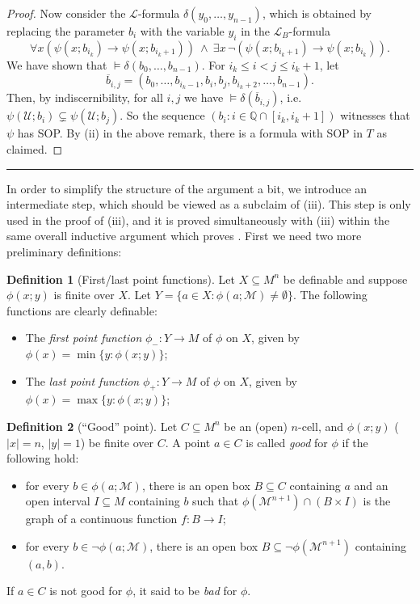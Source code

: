 \documentclass[a4paper]{report}
\newcommand{\ind}{\hspace{15pt}}
\newcommand{\Q}{\mathbb{Q}}
\renewcommand{\L}{\mathcal{L}}
\newcommand{\M}{\mathcal{M}}
\newcommand{\U}{\mathcal{U}}
\renewcommand{\b}{\overline{b}}
\newcommand{\simplies}{\rightarrow}
\theoremstyle{definition}
\newtheorem*{defn*}{Definition}
\theoremstyle{remstyle}
\begin{document}
\begin{proof}
	Now consider the $\L$-formula $\delta(y_0,\ldots,y_{n-1})$, which is obtained by replacing the parameter $b_i$ with the variable $y_i$ in the $\L_B$-formula
	\begin{equation*}
		\forall x(\psi(x;b_{i_k})\simplies\psi(x;b_{i_k+1}))\: \wedge\: \exists x\, \neg(\psi(x;b_{i_k+1})\simplies\psi(x;b_{i_k})).
	\end{equation*}
	We have shown that $\models \delta(b_0,\ldots,b_{n-1})$. For $i_k\leq i<j\leq i_k+1$, let
	\begin{equation*}
		\b_{i,j} = (b_0,\ldots,b_{i_k-1},b_i,b_j,b_{i_k+2},\ldots,b_{n-1}).
	\end{equation*}
	Then, by indiscernibility, for all $i,j$ we have $\models \delta(\b_{i,j})$, i.e.\ $\psi(\U;b_i) \subsetneq \psi(\U;b_j)$. So the sequence $(b_i:i\in\Q\cap[i_k,i_k+1])$ witnesses that $\psi$ has SOP. By (ii) in the above remark, there is a formula with SOP in $T$ as claimed.
\end{proof}


\par\noindent\rule{\textwidth}{0.4pt}

\celldeclem*

\ind In order to simplify the structure of the argument a bit, we introduce an intermediate step, which should be viewed as a subclaim of (iii). This step is only used in the proof of (iii), and it is proved simultaneously with (iii) within the same overall inductive argument which proves . First we need two more preliminary definitions:

\begin{defn*}[First/last point functions]
	Let $X\subseteq M^n$ be definable and suppose $\phi(x;y)$ is finite	over $X$. Let $Y = \{a \in X : \phi(a;\M)\neq\emptyset\}$. The following functions are clearly definable:
	\begin{itemize}
		\item The \emph{first point function} $\phi_-: Y \to M$ of $\phi$ on $X$, given by $\phi(x) = \min\{y : \phi(x; y)\}$;
		\item The \emph{last point function} $\phi_+: Y \to M$ of $\phi$ on $X$, given by $\phi(x) = \max\{y : \phi(x; y)\}$;
	\end{itemize}
\end{defn*}

\begin{defn*}[``Good'' point]
	Let $C\subseteq M^n$ be an (open) $n$-cell, and $\phi(x;y)$ ($|x|=n$, $|y|=1$) be finite over $C$. A point $a\in C$ is called \emph{good} for $\phi$ if the following hold:
	\begin{itemize}
		\item for every $b\in \phi(a;\M)$, there is an open box $B\subseteq C$ containing $a$ and an open interval $I\subseteq M$ containing $b$ such that $\phi(\M^{n+1})\cap(B\times I)$ is the graph of a continuous function $f:B\to I$;
		\item for every $b\in\neg\phi(a;\M)$, there is an open box $B\subseteq \neg\phi(\M^{n+1})$ containing $(a,b)$.
	\end{itemize}
	If $a\in C$ is not good for $\phi$, it said to be \emph{bad} for $\phi$.
\end{defn*}
\end{document}
